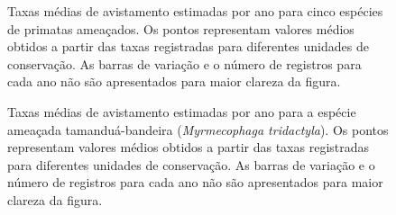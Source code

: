 \documentclass[
  letterpaper,
]{scrbook}
\begin{document}
\begin{figure}[H]


\caption{\label{fig-especies-ameacadas-outros-primatas}Taxas médias de
avistamento estimadas por ano para cinco espécies de primatas ameaçados.
Os pontos representam valores médios obtidos a partir das taxas
registradas para diferentes unidades de conservação. As barras de
variação e o número de registros para cada ano não são apresentados para
maior clareza da figura.}

\end{figure}%

\begin{figure}[H]


\caption{\label{fig-especies-ameacadas-tamandua}Taxas médias de
avistamento estimadas por ano para a espécie ameaçada tamanduá-bandeira
(\emph{Myrmecophaga tridactyla}). Os pontos representam valores médios
obtidos a partir das taxas registradas para diferentes unidades de
conservação. As barras de variação e o número de registros para cada ano
não são apresentados para maior clareza da figura.}

\end{figure}%
\end{document}
